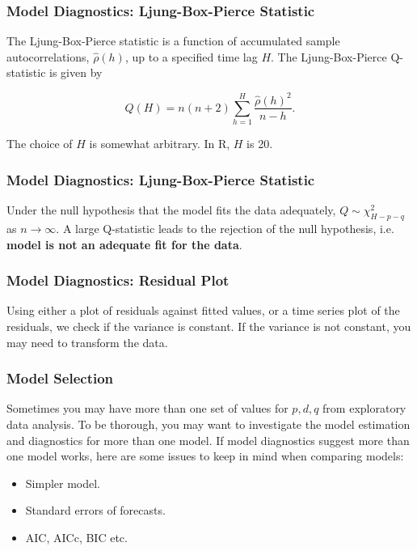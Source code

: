 \documentclass[%
xcolor=pdftex]{beamer}
\begin{document}
\begin{frame}
\frametitle{Model Diagnostics: Ljung-Box-Pierce Statistic}

The Ljung-Box-Pierce statistic is a function of accumulated sample autocorrelations, $\hat{\rho}(h)$, up to a specified time lag $H$. The Ljung-Box-Pierce Q-statistic is given by

\begin{equation} \label{eq:ljung}
Q(H) = n(n+2) \sum_{h=1}^H \frac{\hat{\rho}(h)^2}{n-h}.
\end{equation}

The choice of $H$ is somewhat arbitrary. In R, $H$ is 20.

\end{frame}

\begin{frame}
\frametitle{Model Diagnostics: Ljung-Box-Pierce Statistic}

Under the null hypothesis that the model fits the data adequately, $Q \sim \chi^2_{H-p-q}$ as $n \to \infty$. A large Q-statistic leads to the rejection of the null hypothesis, i.e. \textbf{model is not an adequate fit for the data}.


\end{frame}

\begin{frame}
\frametitle{Model Diagnostics: Residual Plot}

Using either a plot of residuals against fitted values, or a time series plot of the residuals, we check if the variance is constant. If the variance is not constant, you may need to transform the data.


\end{frame}



\begin{frame}
\frametitle{Model Selection}

Sometimes you may have more than one set of values for $p,d,q$ from exploratory data analysis. To be thorough, you may want to investigate the model estimation and diagnostics for more than one model. If model diagnostics suggest more than one model works, here are some issues to keep in mind when comparing models:

\begin{itemize}
\item Simpler model.
\item Standard errors of forecasts.
\item AIC, AICc, BIC etc.
\end{itemize}


\end{frame}
\end{document}
